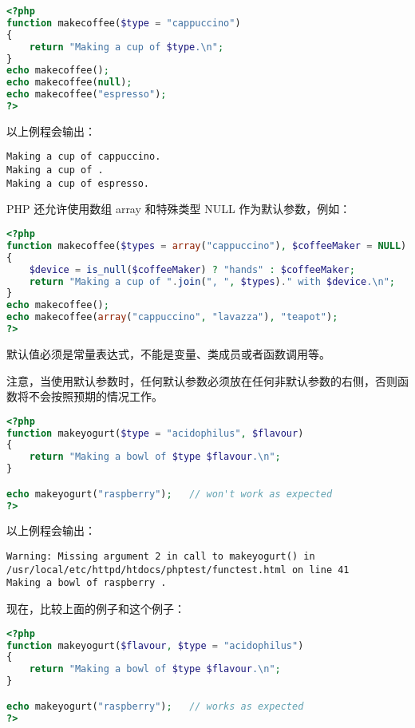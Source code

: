 \begin{lstlisting}[language=PHP]
<?php
function makecoffee($type = "cappuccino")
{
    return "Making a cup of $type.\n";
}
echo makecoffee();
echo makecoffee(null);
echo makecoffee("espresso");
?>
\end{lstlisting}

以上例程会输出：

\begin{verbatim}
Making a cup of cappuccino.
Making a cup of .
Making a cup of espresso.
\end{verbatim}

PHP 还允许使用数组 array 和特殊类型 NULL 作为默认参数，例如：

\begin{lstlisting}[language=PHP]
<?php
function makecoffee($types = array("cappuccino"), $coffeeMaker = NULL)
{
    $device = is_null($coffeeMaker) ? "hands" : $coffeeMaker;
    return "Making a cup of ".join(", ", $types)." with $device.\n";
}
echo makecoffee();
echo makecoffee(array("cappuccino", "lavazza"), "teapot");
?>
\end{lstlisting}


默认值必须是常量表达式，不能是变量、类成员或者函数调用等。

注意，当使用默认参数时，任何默认参数必须放在任何非默认参数的右侧，否则函数将不会按照预期的情况工作。

\begin{lstlisting}[language=PHP]
<?php
function makeyogurt($type = "acidophilus", $flavour)
{
    return "Making a bowl of $type $flavour.\n";
}

echo makeyogurt("raspberry");   // won't work as expected
?>
\end{lstlisting}

以上例程会输出：

\begin{verbatim}
Warning: Missing argument 2 in call to makeyogurt() in 
/usr/local/etc/httpd/htdocs/phptest/functest.html on line 41
Making a bowl of raspberry .
\end{verbatim}


现在，比较上面的例子和这个例子：


\begin{lstlisting}[language=PHP]
<?php
function makeyogurt($flavour, $type = "acidophilus")
{
    return "Making a bowl of $type $flavour.\n";
}

echo makeyogurt("raspberry");   // works as expected
?>
\end{lstlisting}

